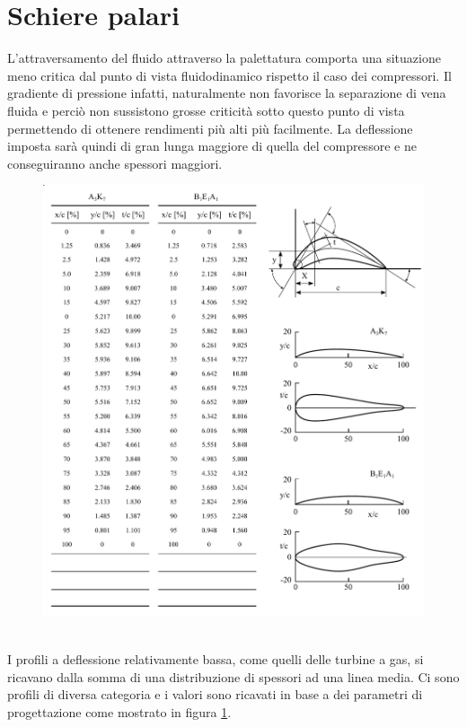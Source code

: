 \section{Schiere palari}
L'attraversamento del fluido attraverso la palettatura comporta una situazione meno critica dal punto di vista fluidodinamico rispetto il caso dei compressori. Il gradiente di pressione infatti, naturalmente non favorisce la separazione di vena fluida e perciò non sussistono grosse criticità sotto questo punto di vista permettendo di ottenere rendimenti più alti più facilmente. La deflessione imposta sarà quindi di gran lunga maggiore di quella del compressore e ne conseguiranno anche spessori maggiori. 
\begin{figure}
\centering
  \includegraphics[width=\textwidth]{fig/SchierePaleTab.pdf}
\caption{}
\label{fig:SchierePaleTab}
\end{figure}
\\I profili a deflessione relativamente bassa, come quelli delle turbine a gas, si ricavano dalla somma di una distribuzione di spessori ad una linea media. Ci sono profili di diversa categoria e i valori sono ricavati in base a dei parametri di progettazione come mostrato in figura \ref{fig:SchierePaleTab}.\\
